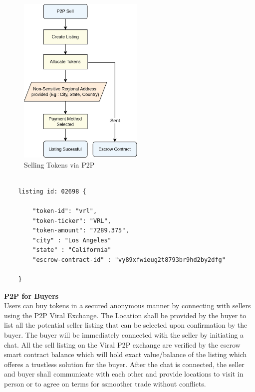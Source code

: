 \documentclass[conference]{IEEEtran}
\begin{document}
\begin{figure}[H]
\begin{center}
\includegraphics[width=6cm]{p2p-sell}
\caption{Selling Tokens via P2P}
\end{center}
\end{figure}

\begin{lstlisting}[caption={Token Sale Listing}, numbers=none]

	listing id: 02698 {
	
    	"token-id": "vrl",
   		"token-ticker": "VRL",
    	"token-amount": "7289.375",
    	"city" : "Los Angeles"
    	"state" : "California"
    	"escrow-contract-id" : "vy89xfwieug2t8793br9hd2by2dfg"
    	
	}
\end{lstlisting}

\textbf{P2P for Buyers}\\

Users can buy tokens in a secured anonymous manner by connecting with sellers using the P2P Viral Exchange. The Location shall be provided by the buyer to list all the potential seller listing that can be selected upon confirmation by the buyer. The buyer will be immediately connected with the seller by initiating a chat. All the sell listing on the Viral P2P exchange are verified by the escrow smart contract balance which will hold exact value/balance of the listing which offeres a trustless solution for the buyer. After the chat is connected, the seller and buyer shall communicate with each other and provide locations to visit in person or to agree on terms for ssmoother trade without conflicts.\\
\end{document}
